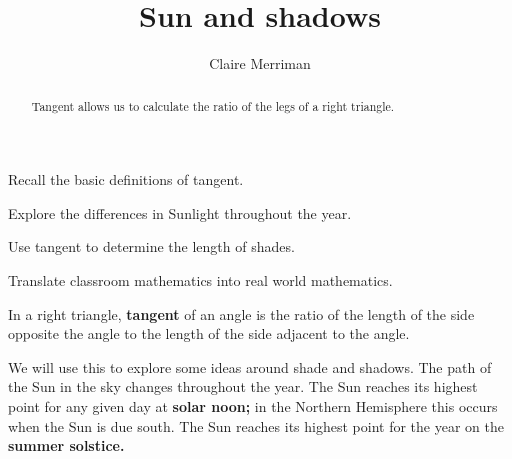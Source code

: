 \documentclass[noauthor,nooutcomes,handout,hints]{ximera}
\title{Sun and shadows} \author{Claire Merriman}
\begin{document}
\begin{abstract}
Tangent allows us to calculate the ratio of the legs of a right triangle.
\end{abstract}
\maketitle

\begin{listOutcomes}
\item  Recall the basic definitions of tangent.
\item Explore the differences in Sunlight throughout the year.
\item Use tangent to determine the length of shades.
\item Translate classroom mathematics into real world mathematics.
\end{listOutcomes}


\mynewpage


\begin{definition}
 In a right triangle, \textbf{tangent} of an angle is the ratio of the length of the side opposite the angle to the length of the side adjacent to the angle. 
\end{definition}
We will use this to explore some ideas around shade and shadows.  The
path of the Sun in the sky changes throughout the year. The Sun
reaches its highest point for any given day at \textbf{solar noon;} in
the Northern Hemisphere this occurs when the Sun is due south. The Sun
reaches its highest point for the year on the \textbf{summer solstice.}

\begin{center}
 
\end{center}
\end{document}
